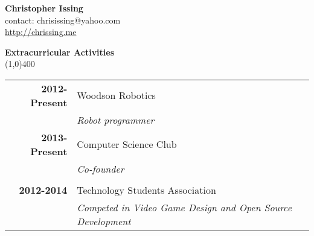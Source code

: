 \documentclass[7pt]{report}
\begin{document}
\begin{center}
	{\bf {\huge Christopher Issing}}\\
	{\small contact: chrisissing@yahoo.com}\\
	{\small \href{http://chrissing.me}{http://chrissing.me}}
\end{center} 
\vspace{0.1cm}

{\bf {\Large Extracurricular Activities}} \\
\line(1,0){400} \\
\begin{tabular}{r|l}
	{\bf 2012-Present} & Woodson Robotics \\ 
	                   & \textit{Robot programmer}
	\vspace{0.3cm} \\
	{\bf 2013-Present} & Computer Science Club \\ 
										 & \textit{Co-founder }\\
	\vspace{0.3cm} \\
	{\bf 2012-2014}    & Technology Students Association \\ 
										 & \textit{Competed in Video Game Design and Open Source Development} 
\end{tabular}
\end{document}
